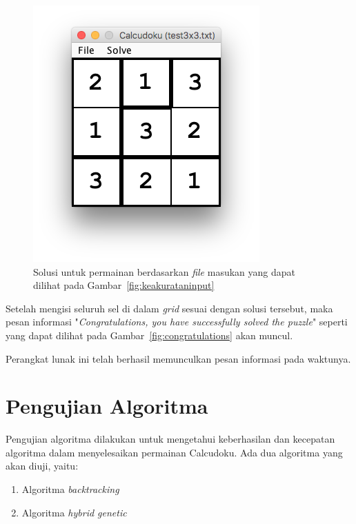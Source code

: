 \begin{enumerate}
\begin{figure}
\centering
\captionsetup{justification=centering}
\includegraphics[scale=0.5]{Gambar/ImplementasiPengujian/Output2.png}
\caption[Solusi untuk permainan berdasarkan \textit{file} masukan yang dapat dilihat pada Gambar~\ref{fig:keakurataninput}]{Solusi untuk permainan berdasarkan \textit{file} masukan yang dapat dilihat pada Gambar~\ref{fig:keakurataninput}}
\label{fig:keakuratansolusi}
\end{figure}

Setelah mengisi seluruh sel di dalam \textit{grid} sesuai dengan solusi tersebut, maka pesan informasi "\textit{Congratulations, you have successfully solved the puzzle}" seperti yang dapat dilihat pada Gambar~\ref{fig:congratulations} akan muncul.

Perangkat lunak ini telah berhasil memunculkan pesan informasi pada waktunya.

\end{enumerate}

\section{Pengujian Algoritma}
\label{sec:pengujianalgoritma}

Pengujian algoritma dilakukan untuk mengetahui keberhasilan dan kecepatan algoritma dalam menyelesaikan permainan Calcudoku. Ada dua algoritma yang akan diuji, yaitu:

\begin{enumerate}
\item Algoritma \textit{backtracking}
\item Algoritma \textit{hybrid genetic}
\end{enumerate}


